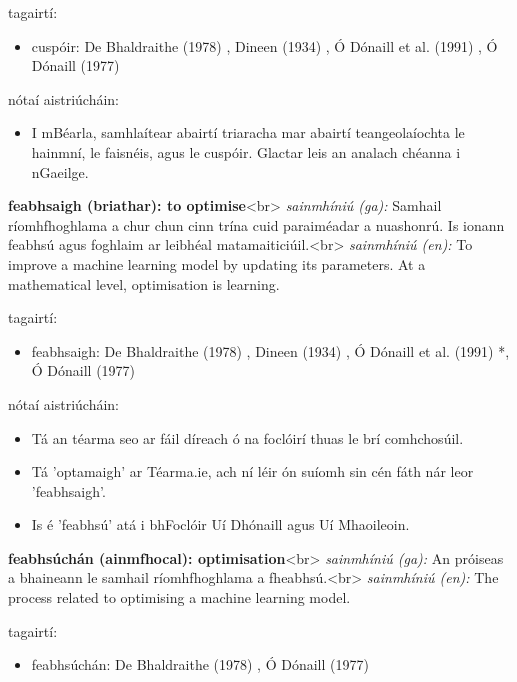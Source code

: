 \documentclass{article}
\begin{document}
tagairtí:
\begin{itemize}
	\item cuspóir: De Bhaldraithe (1978) \cite{de-bhaldraithe}, Dineen (1934) \cite{dineen}, Ó Dónaill et al. (1991) \cite{focloir-beag}, Ó Dónaill (1977) \cite{odonaill}
\end{itemize}

nótaí aistriúcháin:
\begin{itemize}
	\item I mBéarla, samhlaítear abairtí triaracha mar abairtí teangeolaíochta le hainmní, le faisnéis, agus le cuspóir. Glactar leis an analach chéanna i nGaeilge.
\end{itemize}


\textbf{feabhsaigh (briathar): to optimise}<br>
\textit{sainmhíniú (ga):} Samhail ríomhfhoghlama a chur chun cinn trína cuid paraiméadar a nuashonrú. Is ionann feabhsú agus foghlaim ar leibhéal matamaiticiúil.<br>
\textit{sainmhíniú (en):} To improve a machine learning model by updating its parameters. At a mathematical level, optimisation is learning.

tagairtí:
\begin{itemize}
	\item feabhsaigh: De Bhaldraithe (1978) \cite{de-bhaldraithe}, Dineen (1934) \cite{dineen}, Ó Dónaill et al. (1991) \cite{focloir-beag}*, Ó Dónaill (1977) \cite{odonaill}
\end{itemize}

nótaí aistriúcháin:
\begin{itemize}
	\item Tá an téarma seo ar fáil díreach ó na foclóirí thuas le brí comhchosúil.
	\item Tá 'optamaigh' ar Téarma.ie, ach ní léir ón suíomh sin cén fáth nár leor 'feabhsaigh'.
	\item Is é 'feabhsú' atá i bhFoclóir Uí Dhónaill agus Uí Mhaoileoin.
\end{itemize}


\textbf{feabhsúchán (ainmfhocal): optimisation}<br>
\textit{sainmhíniú (ga):} An próiseas a bhaineann le samhail ríomhfhoghlama a fheabhsú.<br>
\textit{sainmhíniú (en):} The process related to optimising a machine learning model.

tagairtí:
\begin{itemize}
	\item feabhsúchán: De Bhaldraithe (1978) \cite{de-bhaldraithe}, Ó Dónaill (1977) \cite{odonaill}
\end{itemize}
\end{document}
